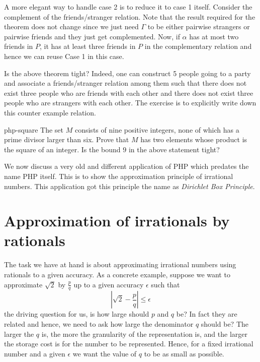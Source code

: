 \begin{remark}
A more elegant way to handle case 2 is to reduce it to case 1 itself. Consider the complement of the friends/stranger relation. Note that the result required for the theorem does not change since we just need $\Gamma$ to be either pairwise strangers or pairwise friends and they just get complemented. Now, if $\alpha$ has at most two friends in $P$, it has at least three friends in $P$ in the complementary relation and hence we can reuse Case 1 in this case.
\end{remark}

\begin{exercise}
Is the above theorem tight? Indeed, one can construct 5 people going to a party and associate a friends/stranger relation among them such that there does not exist three people who are friends with each other and  there does not exist three people who are strangers with each other. The exercise is to explicitly write down this counter example relation.
\end{exercise}

\begin{exercise-prob}
\begin{show-ps1}{php-square}
The set $M$ consists of nine positive integers, none of which has a
prime divisor larger than six. Prove that $M$ has two elements whose
product is the square of an integer. Is the bound $9$ in the above statement tight?
\end{show-ps1}
\end{exercise-prob}


We now discuss a very old and different application of PHP which predates the name PHP itself. This is to show the approximation principle of irrational numbers. This application got this principle the name as {\em Dirichlet Box Principle}.

\section{Approximation of irrationals by rationals}
The task we have at hand is about approximating irrational numbers using rationals to a given accuracy. As a concrete example, suppose we want to approximate $\sqrt{2}$ by $\frac{p}{q}$ up to a given accuracy $\epsilon$ such that
$$ \left| \sqrt{2} - \frac{p}{q} \right| \le \epsilon $$
the driving question for us, is how large should $p$ and $q$ be? In fact they are related and hence, we need to ask how large the denominator $q$ should be? The larger the $q$ is, the more the granularity of the representation is, and the larger the storage cost is for the number to be represented. Hence, for a fixed irrational number and a given $\epsilon$ we want the value of $q$ to be as small as possible.

